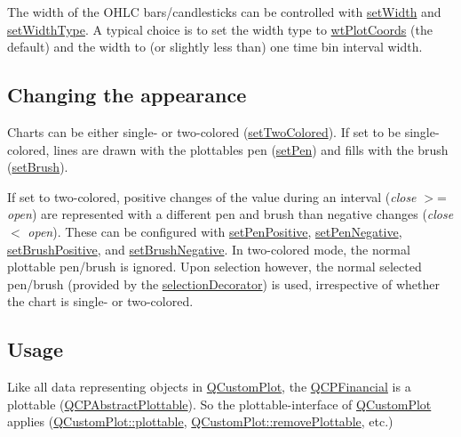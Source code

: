 The width of the O\+H\+LC bars/candlesticks can be controlled with \mbox{\hyperlink{class_q_c_p_financial_a99633f8bac86a61d534ae5eeb1a3068f}{set\+Width}} and \mbox{\hyperlink{class_q_c_p_financial_a204b7b710352796593a432b723e34089}{set\+Width\+Type}}. A typical choice is to set the width type to \mbox{\hyperlink{class_q_c_p_financial_aef1761dda71a53dc5269685e9e492626af676bc8dbe700b96b333329c9dbfc30f}{wt\+Plot\+Coords}} (the default) and the width to (or slightly less than) one time bin interval width.\hypertarget{class_q_c_p_financial_qcpfinancial-appearance}{}\subsection{Changing the appearance}\label{class_q_c_p_financial_qcpfinancial-appearance}
Charts can be either single-\/ or two-\/colored (\mbox{\hyperlink{class_q_c_p_financial_a138e44aac160a17a9676652e240c5f08}{set\+Two\+Colored}}). If set to be single-\/colored, lines are drawn with the plottable\textquotesingle{}s pen (\mbox{\hyperlink{class_q_c_p_abstract_plottable_ab74b09ae4c0e7e13142fe4b5bf46cac7}{set\+Pen}}) and fills with the brush (\mbox{\hyperlink{class_q_c_p_abstract_plottable_a7a4b92144dca6453a1f0f210e27edc74}{set\+Brush}}).

If set to two-\/colored, positive changes of the value during an interval ({\itshape close} $>$= {\itshape open}) are represented with a different pen and brush than negative changes ({\itshape close} $<$ {\itshape open}). These can be configured with \mbox{\hyperlink{class_q_c_p_financial_ac58aa3adc7a35aab0088764b840683e5}{set\+Pen\+Positive}}, \mbox{\hyperlink{class_q_c_p_financial_afe5c07e94ccea01a75b3a2476993c346}{set\+Pen\+Negative}}, \mbox{\hyperlink{class_q_c_p_financial_a5ebff2b1764efd07cc44942e67821829}{set\+Brush\+Positive}}, and \mbox{\hyperlink{class_q_c_p_financial_a8bbdd87629f9144b3ef51af660c0961a}{set\+Brush\+Negative}}. In two-\/colored mode, the normal plottable pen/brush is ignored. Upon selection however, the normal selected pen/brush (provided by the \mbox{\hyperlink{class_q_c_p_abstract_plottable_a7861518e47ca0c6a0c386032c2db075e}{selection\+Decorator}}) is used, irrespective of whether the chart is single-\/ or two-\/colored.\hypertarget{class_q_c_p_financial_qcpfinancial-usage}{}\subsection{Usage}\label{class_q_c_p_financial_qcpfinancial-usage}
Like all data representing objects in \mbox{\hyperlink{class_q_custom_plot}{Q\+Custom\+Plot}}, the \mbox{\hyperlink{class_q_c_p_financial}{Q\+C\+P\+Financial}} is a plottable (\mbox{\hyperlink{class_q_c_p_abstract_plottable}{Q\+C\+P\+Abstract\+Plottable}}). So the plottable-\/interface of \mbox{\hyperlink{class_q_custom_plot}{Q\+Custom\+Plot}} applies (\mbox{\hyperlink{class_q_custom_plot_a32de81ff53e263e785b83b52ecd99d6f}{Q\+Custom\+Plot\+::plottable}}, \mbox{\hyperlink{class_q_custom_plot_af3dafd56884208474f311d6226513ab2}{Q\+Custom\+Plot\+::remove\+Plottable}}, etc.)


